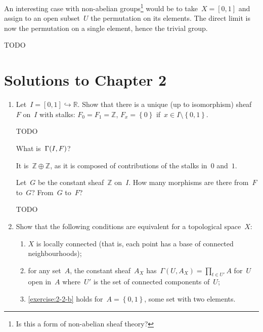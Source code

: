 \documentclass[a4paper,11pt]{article}
\begin{document}
\begin{enumerate}
    \begin{solution}
      An interesting case with non-abelian groups\footnote{Is this a form of non-abelian sheaf theory?} would be to take~$X=[0,1]$ and assign to an open subset~$U$ the permutation on its elements. The direct limit is now the permutation on a single element, hence the trivial group.

      TODO
    \end{solution}
\end{enumerate}


\section{Solutions to Chapter 2}
\begin{enumerate}
  \item Let~$I=[0,1]\hookrightarrow\mathbb{R}$. Show that there is a unique (up to isomorphism) sheaf~$F$ on~$I$ with stalks: $F_0=F_1=\mathbb{Z}$, $F_x=\left\{ 0 \right\}$ if~$x\in I\setminus\left\{ 0,1 \right\}$.

    \begin{solution}
      TODO
    \end{solution}

    What is~$\mathrm{\Gamma}(I, F)$?

    \begin{solution}
      It is~$\mathbb{Z}\oplus\mathbb{Z}$, as it is composed of contributions of the stalks in~$0$ and~$1$.
    \end{solution}

    Let~$G$ be the constant sheaf~$\mathbb{Z}$ on~$I$. How many morphisms are there from~$F$ to~$G$? From~$G$ to~$F$?

    \begin{solution}
      TODO
    \end{solution}

  \item Show that the following conditions are equivalent for a topological space~$X$:
    \begin{enumerate}
      \item\label{exercise:2-2-a} $X$ is locally connected (that is, each point has a base of connected neighbourhoods);
      \item\label{exercise:2-2-b} for any set~$A$, the constant sheaf~$A_X$ has~$\Gamma(U,A_X)=\prod_{t\in U'}A$ for~$U$ open in~$A$ where~$U'$ is the set of connected components of~$U$;
      \item\label{exercise:2-2-c} \ref{exercise:2-2-b} holds for~$A=\left\{ 0,1 \right\}$, some set with two elements.
    \end{enumerate}


\end{enumerate}
\end{document}
